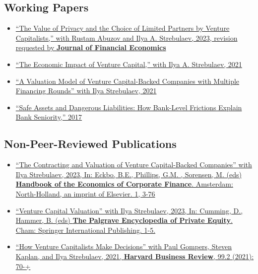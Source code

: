 \documentclass[11pt]{article}
\begin{document}
\subsection*{Working Papers}
\begin{itemize}[leftmargin=0pt, labelwidth=0cm, ]
    \item \href{https://papers.ssrn.com/sol3/papers.cfm?abstract_id=4235337}{%
        ``The Value of Privacy and the Choice of Limited Partners by Venture Capitalists,'' 
        with Rustam Abuzov and Ilya A. Strebulaev, 
        2023, revision requested by \textbf{Journal of Financial Economics}}

    \item \href{https://papers.ssrn.com/sol3/papers.cfm?abstract_id=2681841}{%
        ``The Economic Impact of Venture Capital,'' 
        with Ilya A. Strebulaev, 
        2021}

    \item \href{https://papers.ssrn.com/sol3/papers.cfm?abstract_id=3725240}{%
        ``A Valuation Model of Venture Capital-Backed Companies with Multiple Financing Rounds'' 
        with Ilya Strebulaev, 
        2021}

    \item \href{https://papers.ssrn.com/sol3/papers.cfm?abstract_id=2526574}{%
        ``Safe Assets and Dangerous Liabilities: How Bank-Level Frictions Explain Bank Seniority,'' 
        2017}
\end{itemize}

\subsection*{Non-Peer-Reviewed Publications}
\begin{itemize}[leftmargin=0pt, labelwidth=0cm, ]
    \item \href{https://papers.ssrn.com/sol3/papers.cfm?abstract_id=4038538}{%
        ``The Contracting and Valuation of Venture Capital-Backed Companies'' 
        with Ilya Strebulaev, 
        2023, In: Eckbo, B.E., Phillips, G.M. , Sorensen, M. (eds) \textbf{Handbook of the Economics of Corporate Finance}. Amsterdam: North-Holland, an imprint of Elsevier. 1, 3-76}

    \item \href{https://papers.ssrn.com/sol3/papers.cfm?abstract_id=4038538}{%
        ``Venture Capital Valuation'' 
        with Ilya Strebulaev, 
        2023, In: Cumming, D., Hammer, B. (eds) \textbf{The Palgrave Encyclopedia of Private Equity}. Cham: Springer International Publishing. 1-5.}

    \item \href{https://papers.ssrn.com/sol3/papers.cfm?abstract_id=2801385}{%
        ``How Venture Capitalists Make Decisions'' 
        with Paul Gompers, Steven Kaplan, and Ilya Strebulaev, 
        2021, \textbf{Harvard Business Review}, 99.2 (2021): 70-+}
\end{itemize}
\end{document}
